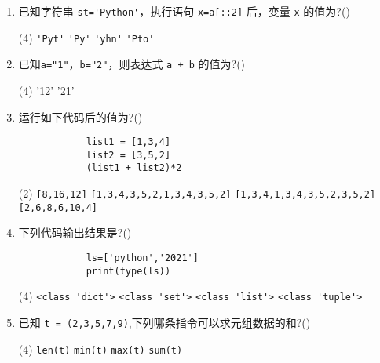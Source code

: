 \documentclass[11pt]{ctexart}
\begin{document}
\begin{enumerate}
        \item 已知字符串 \lstinline!st='Python'!，执行语句 \lstinline!x=a[::2]! 后，变量 \lstinline{x} 的值为?(\qquad)
        \begin{tasks}(4)
            \task \lstinline!'Pyt'!
            \task \lstinline!'Py'!
            \task \lstinline!'yhn'!
            \task \lstinline!'Pto'!
        \end{tasks}

        \item 已知\lstinline!a="1"!，\lstinline!b="2"!，则表达式 \lstinline{a + b} 的值为?(\qquad)
        \begin{tasks}(4)
            \task '12'
            \task '21'
        \end{tasks}

        \item 运行如下代码后的值为?(\qquad)
        \begin{lstlisting}
            list1 = [1,3,4]
            list2 = [3,5,2]
            (list1 + list2)*2
        \end{lstlisting}
        \begin{tasks}(2)
            \task \lstinline![8,16,12]!
            \task \lstinline![1,3,4,3,5,2,1,3,4,3,5,2]!
            \task \lstinline![1,3,4,1,3,4,3,5,2,3,5,2]!
            \task \lstinline![2,6,8,6,10,4]!
        \end{tasks}

        \item 下列代码输出结果是?(\qquad)
        \begin{lstlisting}
            ls=['python','2021']
            print(type(ls))
        \end{lstlisting}
        \begin{tasks}(4)
            \task \lstinline!<class 'dict'>!
            \task \lstinline!<class 'set'>!
            \task \lstinline!<class 'list'>!
            \task \lstinline!<class 'tuple'>!
        \end{tasks}

        \item 已知 \lstinline!t = (2,3,5,7,9)!,下列哪条指令可以求元组数据的和?(\qquad)
        \begin{tasks}(4)
            \task \lstinline!len(t)!
            \task \lstinline!min(t)!
            \task \lstinline!max(t)!
            \task \lstinline!sum(t)!
        \end{tasks}


\end{enumerate}
\end{document}
